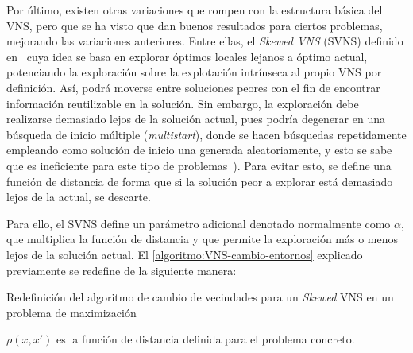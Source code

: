 Por último, existen otras variaciones que rompen con la estructura básica del VNS, pero que se ha visto que dan buenos resultados para ciertos problemas, mejorando las variaciones anteriores. Entre ellas, el \textit{Skewed VNS} (SVNS) definido en~\cite{svns-def} cuya idea se basa en explorar óptimos locales lejanos a óptimo actual, potenciando la exploración sobre la explotación intrínseca al propio VNS por definición. Así, podrá moverse entre soluciones peores con el fin de encontrar información reutilizable en la solución. Sin embargo, la exploración debe realizarse demasiado lejos de la solución actual, pues podría degenerar en una búsqueda de inicio múltiple (\textit{multistart}), donde se hacen búsquedas repetidamente empleando como solución de inicio una generada aleatoriamente, y esto se sabe que es ineficiente para este tipo de problemas~\cite{vns}). Para evitar esto, se define una función de distancia de forma que si la solución peor a explorar está demasiado lejos de la actual, se descarte.

Para ello, el SVNS define un parámetro adicional denotado normalmente como $\alpha$, que multiplica la función de distancia y que permite la exploración más o menos lejos de la solución actual. El \autoref{algoritmo:VNS-cambio-entornos} explicado previamente se redefine de la siguiente manera:

\begin{algorithm}[h]
    \caption{Redefinición del algoritmo de cambio de vecindades para un \textit{Skewed} VNS en un problema de maximización}
    \label{algoritmo:SVNS-cambio-entornos}

    \DontPrintSemicolon
    \bigskip


\end{algorithm}

$\rho(x,x')$ es la función de distancia definida para el problema concreto.


